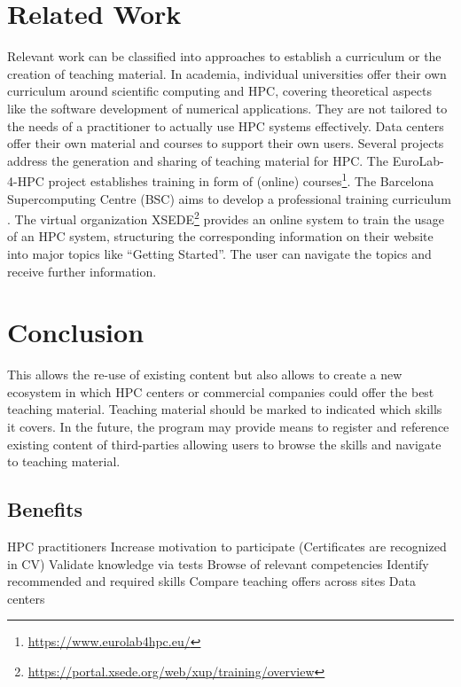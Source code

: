 \documentclass[jocse]{jocseart}
\newcommand{\jk}[1]{\todo[inline]{JK: #1}}
\begin{document}
\section{Related Work}

\label{sec:related}

\jk{Please everyone!}

Relevant work can be classified into approaches to establish a curriculum or the creation of teaching material.
In academia, individual universities offer their own curriculum around scientific computing and HPC, covering theoretical aspects like the software development of numerical applications.
They are not tailored to the needs of a practitioner to actually use HPC systems effectively.
Data centers offer their own material and courses to support their own users.
Several projects address the generation and sharing of teaching material for HPC.
The EuroLab-4-HPC project establishes training in form of (online) courses\footnote{\url{https://www.eurolab4hpc.eu/}}.
The Barcelona Supercomputing Centre (BSC) aims to develop a professional training curriculum \cite{sancho2016bsc}.
The virtual organization XSEDE\footnote{\url{https://portal.xsede.org/web/xup/training/overview}} provides an online system to train the usage of an HPC system, structuring the corresponding information on their website into major topics like “Getting Started”.
The user can navigate the topics and receive further information.

\section{Conclusion}
\label{sec:conclusion}


This allows the re-use of existing content but also allows to create a new ecosystem in which HPC centers or commercial companies could offer the best teaching material.
Teaching material should be marked to indicated which skills it covers.
In the future, the program may provide means to register and reference existing content of third-parties allowing users to browse the skills and navigate to teaching material.


\subsection{Benefits}

HPC practitioners
Increase motivation to participate
(Certificates are recognized in CV)
Validate knowledge via tests
Browse of relevant competencies
Identify recommended and required skills
Compare teaching offers across sites
Data centers
\end{document}
